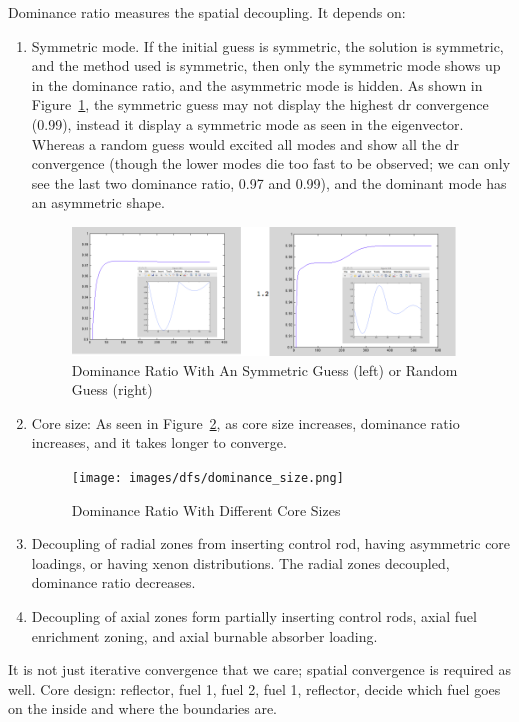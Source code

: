 \documentclass{school-22.211-notes}
\begin{document}
Dominance ratio measures the spatial decoupling. It depends on: 
\begin{enumerate}
\item Symmetric mode. If the initial guess is symmetric, the solution is symmetric, and the method used is symmetric, then only the symmetric mode shows up in the dominance ratio, and the asymmetric mode is hidden. As shown in Figure~\ref{dominance-symmetric}, the symmetric guess may not display the highest dr convergence (0.99), instead it display a symmetric mode as seen in the eigenvector. Whereas a random guess would excited all modes and show all the dr convergence (though the lower modes die too fast to be observed; we can only see the last two dominance ratio, 0.97 and 0.99), and the dominant mode has an asymmetric shape.  
\begin{figure}
  \centering
  \includegraphics[width=4in]{images/dfs/dominance_ratio.png}
  \caption{Dominance Ratio With An Symmetric Guess (left) or Random Guess (right)}
  \label{dominance-symmetric}
\end{figure}

\item Core size: As seen in Figure~\ref{dominance-size}, as core size increases, dominance ratio increases, and it takes longer to converge. 
\begin{figure}
  \centering
  \texttt{[image: images/dfs/dominance\_size.png]}
  \caption{Dominance Ratio With Different Core Sizes}
  \label{dominance-size}
\end{figure}

\item Decoupling of radial zones from inserting control rod, having asymmetric core loadings, or having xenon distributions. The radial zones decoupled, dominance ratio decreases. 

\item Decoupling of axial zones form partially inserting control rods, axial fuel enrichment zoning, and axial burnable absorber loading. 
\end{enumerate}


\clearpage
{}
It is not just iterative convergence that we care; spatial convergence is required as well. Core design: reflector, fuel 1, fuel 2, fuel 1, reflector, decide which fuel goes on the inside and where the boundaries are. 
\end{document}
